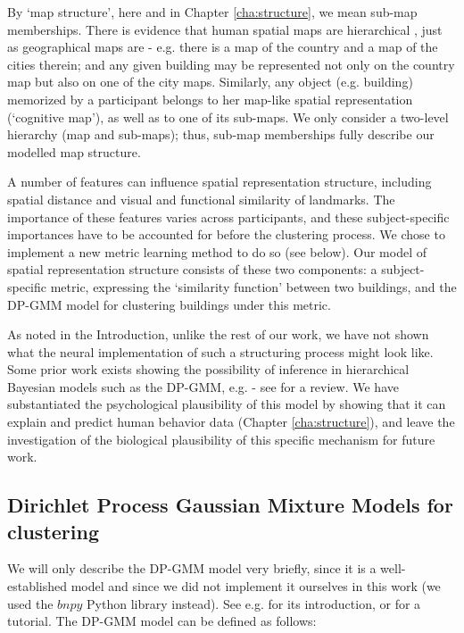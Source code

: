 By `map structure', here and in Chapter \ref{cha:structure}, we mean sub-map memberships. There is evidence that human spatial maps are hierarchical \citep{hirtle1985evidence,mcnamara1989subjective,greenauer2010micro}, just as geographical maps are - e.g. there is a map of the country and a map of the cities therein; and any given building may be represented not only on the country map but also on one of the city maps. Similarly, any object (e.g. building) memorized by a participant belongs to her map-like spatial representation (`cognitive map'), as well as to one of its sub-maps. We only consider a two-level hierarchy (map and sub-maps); thus, sub-map memberships fully describe our modelled map structure.

A number of features can influence spatial representation structure, including spatial distance and visual and functional similarity of landmarks. The importance of these features varies across participants, and these subject-specific importances have to be accounted for before the clustering process. We chose to implement a new metric learning method to do so (see below). Our model of spatial representation structure consists of these two components: a subject-specific metric, expressing the `similarity function' between two buildings, and the DP-GMM model for clustering buildings under this metric.

As noted in the Introduction, unlike the rest of our work, we have not shown what the neural implementation of such a structuring process might look like. Some prior work exists showing the possibility of inference in hierarchical Bayesian models such as the DP-GMM, e.g. \citep{shi2009neural} - see \citep{sanborn2015types} for a review. We have substantiated the psychological plausibility of this model by showing that it can explain and predict human behavior data (Chapter \ref{cha:structure}), and leave the investigation of the biological plausibility of this specific mechanism for future work.

\subsection{Dirichlet Process Gaussian Mixture Models for clustering}

We will only describe the DP-GMM model very briefly, since it is a well-established model and since we did not implement it ourselves in this work (we used the $bnpy$ Python library instead). See e.g. \citep{rasmussen1999infinite} for its introduction, or \citep{gershman2012tutorial} for a tutorial. The DP-GMM model can be defined as follows:

